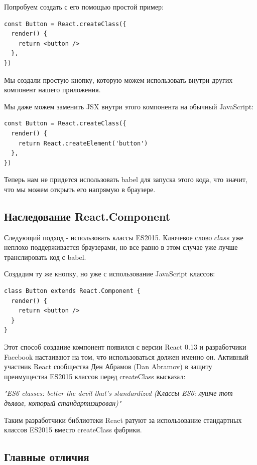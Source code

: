Попробуем создать с его помощью простой пример:

\begin{lstlisting}
const Button = React.createClass({
  render() {
    return <button />
  },
})
\end{lstlisting}

Мы создали простую кнопку, которую можем использовать внутри других компонент нашего приложения.

Мы даже можем заменить JSX внутри этого компонента на обычный JavaScript:

\begin{lstlisting}
const Button = React.createClass({
  render() {
    return React.createElement('button')
  },
})
\end{lstlisting}

Теперь нам не придется использовать babel для запуска этого кода, что значит, что мы можем открыть его напрямую в браузере.

\subsection*{Наследование React.Component}

Следующий подход - использовать классы ES2015. Ключевое слово $class$ уже неплохо поддерживается браузерами, но все равно в этом случае уже лучше транслировать код с babel.

Создадим ту же кнопку, но уже с использование JavaScript классов:

\begin{lstlisting}
class Button extends React.Component {
  render() {
    return <button />
  }
}
\end{lstlisting}

Этот способ создание компонент появился с версии React 0.13 и разработчики Facebook настаивают на том, что использоваться должен именно он. Активный участник React сообщества Ден Абрамов (Dan Abramov) в защиту преимущества ES2015 классов перед createClass высказал: 

\textit{"ES6 classes: better the devil that's standardized (Классы ES6: лушче тот дъявол, который стандартизирован)"}

Таким разработчики библиотеки React ратуют за использование стандартных классов ES2015 вместо createClass фабрики. 

\subsection*{Главные отличия}

